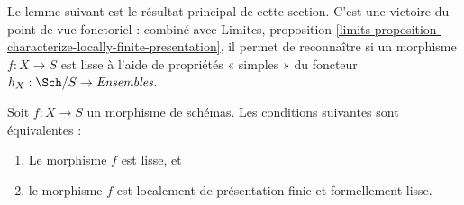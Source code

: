 \noindent
Le lemme suivant est le résultat principal de cette section. C'est une victoire du
point de vue fonctoriel : combiné avec
Limites,
proposition \ref{limits-proposition-characterize-locally-finite-presentation},
il permet de reconnaître si un morphisme $f : X \to S$ est lisse à l'aide de
propriétés « simples » du foncteur $h_X : \Sch/S \to \textit{Ensembles}$.

\begin{lemma}
\label{lemma-smooth-formally-smooth}
Soit $f : X \to S$ un morphisme de schémas.
Les conditions suivantes sont équivalentes :
\begin{enumerate}
\item Le morphisme $f$ est lisse, et
\item le morphisme $f$ est localement de présentation finie et
formellement lisse.
\end{enumerate}
\end{lemma}


